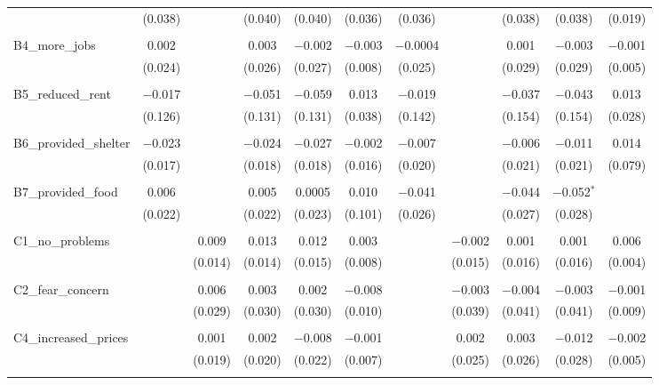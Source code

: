\begin{table}[H]
\begin{tabular}{@{\extracolsep{4pt}}lcccccccccc}
  & (0.038) &  & (0.040) & (0.040) & (0.036) & (0.036) &  & (0.038) & (0.038) & (0.019) \\ 
  & & & & & & & & & & \\ 
 B4\_more\_jobs & 0.002 &  & 0.003 & $-$0.002 & $-$0.003 & $-$0.0004 &  & 0.001 & $-$0.003 & $-$0.001 \\ 
  & (0.024) &  & (0.026) & (0.027) & (0.008) & (0.025) &  & (0.029) & (0.029) & (0.005) \\ 
  & & & & & & & & & & \\ 
 B5\_reduced\_rent & $-$0.017 &  & $-$0.051 & $-$0.059 & 0.013 & $-$0.019 &  & $-$0.037 & $-$0.043 & 0.013 \\ 
  & (0.126) &  & (0.131) & (0.131) & (0.038) & (0.142) &  & (0.154) & (0.154) & (0.028) \\ 
  & & & & & & & & & & \\ 
 B6\_provided\_shelter & $-$0.023 &  & $-$0.024 & $-$0.027 & $-$0.002 & $-$0.007 &  & $-$0.006 & $-$0.011 & 0.014 \\ 
  & (0.017) &  & (0.018) & (0.018) & (0.016) & (0.020) &  & (0.021) & (0.021) & (0.079) \\ 
  & & & & & & & & & & \\ 
 B7\_provided\_food & 0.006 &  & 0.005 & 0.0005 & 0.010 & $-$0.041 &  & $-$0.044 & $-$0.052$^{*}$ &  \\ 
  & (0.022) &  & (0.022) & (0.023) & (0.101) & (0.026) &  & (0.027) & (0.028) &  \\ 
  & & & & & & & & & & \\ 
 C1\_no\_problems &  & 0.009 & 0.013 & 0.012 & 0.003 &  & $-$0.002 & 0.001 & 0.001 & 0.006 \\ 
  &  & (0.014) & (0.014) & (0.015) & (0.008) &  & (0.015) & (0.016) & (0.016) & (0.004) \\ 
  & & & & & & & & & & \\ 
 C2\_fear\_concern &  & 0.006 & 0.003 & 0.002 & $-$0.008 &  & $-$0.003 & $-$0.004 & $-$0.003 & $-$0.001 \\ 
  &  & (0.029) & (0.030) & (0.030) & (0.010) &  & (0.039) & (0.041) & (0.041) & (0.009) \\ 
  & & & & & & & & & & \\ 
 C4\_increased\_prices &  & 0.001 & 0.002 & $-$0.008 & $-$0.001 &  & 0.002 & 0.003 & $-$0.012 & $-$0.002 \\ 
  &  & (0.019) & (0.020) & (0.022) & (0.007) &  & (0.025) & (0.026) & (0.028) & (0.005) \\ 
  & & & & & & & & & & \\ 

\end{tabular}
\end{table}

